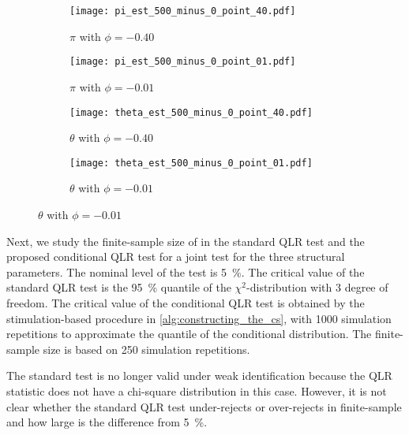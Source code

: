 \begin{figure}[htb]
  
  \caption[Parameter Estimates' \textit{t}-Statistics]{Parameter Estimates' $t$-Statistics}
  \label{fig:sim_parameter_estimates}


  \begin{subfigure}[t]{.48\textwidth}
    \caption[pi with phi = -0.40]{$\pi$ with $\phi = -0.40$}
    \texttt{[image: pi\_est\_500\_minus\_0\_point\_40.pdf]}
  \end{subfigure}
%
  \hfill
%
  \begin{subfigure}[t]{.48\textwidth}
    \caption[pi with phi = -0.01]{$\pi$ with $\phi = -0.01$}
    \texttt{[image: pi\_est\_500\_minus\_0\_point\_01.pdf]}
  \end{subfigure}
%
  \begin{subfigure}[b]{.48\textwidth}
    \caption[theta with phi = -0.40]{$\theta$ with $\phi = -0.40$}
    \texttt{[image: theta\_est\_500\_minus\_0\_point\_40.pdf]}
  \end{subfigure}
%
  \hfill
%
  \begin{subfigure}[b]{.48\textwidth}
    \caption[theta with phi = -0.01]{$\theta$ with $\phi = -0.01$}
    \texttt{[image: theta\_est\_500\_minus\_0\_point\_01.pdf]}
  \end{subfigure}
%
\end{figure}


Next, we study the finite-sample size of in the standard QLR test and the proposed conditional QLR test for a joint test for the three structural parameters. The nominal level of the test is \SI{5}{\percent}. The critical value of the standard QLR test is the \SI{95}{\percent} quantile of the $\chi^2$-distribution with $3$ degree of freedom. The critical value of the conditional QLR test is obtained by the stimulation-based procedure in \cref{alg:constructing_the_cs}, with \num{1000} simulation repetitions to approximate the quantile of the conditional distribution. The finite-sample size is based on \num{250} simulation repetitions.

The standard test is no longer valid under weak identification because the QLR statistic does not have a chi-square distribution in this case. However, it is not clear whether the standard QLR test under-rejects or over-rejects in finite-sample and how large is the difference from \SI{5}{\percent}. 


